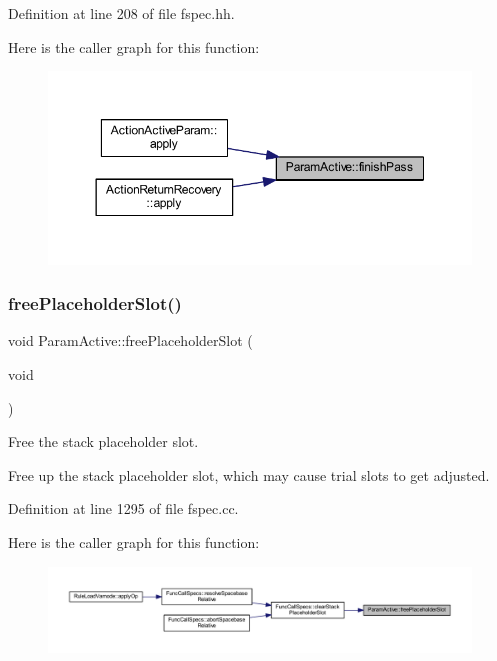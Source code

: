 Definition at line 208 of file fspec.\+hh.

Here is the caller graph for this function\+:
\nopagebreak
\begin{figure}[H]
\begin{center}
\leavevmode
\includegraphics[width=350pt]{class_param_active_a0cc6c52ae0d0c76d38fb603a10a7b53e_icgraph}
\end{center}
\end{figure}
\mbox{\label{class_param_active_a42ec2498ce1d913aaed22b67b479d6e5}} 
\subsubsection{\texorpdfstring{freePlaceholderSlot()}{freePlaceholderSlot()}}
{\footnotesize\ttfamily void Param\+Active\+::free\+Placeholder\+Slot (\begin{DoxyParamCaption}\item[{void}]{ }\end{DoxyParamCaption})}



Free the stack placeholder slot. 

Free up the stack placeholder slot, which may cause trial slots to get adjusted. 

Definition at line 1295 of file fspec.\+cc.

Here is the caller graph for this function\+:
\nopagebreak
\begin{figure}[H]
\begin{center}
\leavevmode
\includegraphics[width=350pt]{class_param_active_a42ec2498ce1d913aaed22b67b479d6e5_icgraph}
\end{center}
\end{figure}
\mbox{\label{class_param_active_a3d3a20decd7830cd778d890f6a41e83b}} 

